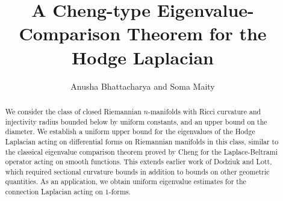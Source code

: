 \documentclass[10 pt, reqno]{amsart}
\begin{document}
\title{A Cheng-type Eigenvalue-Comparison Theorem for the Hodge Laplacian }
\author[A. Bhattacharya and S. Maity]{Anusha Bhattacharya and Soma Maity}

\address{Department of Mathematical Sciences, Indian Institute of Science Education and Research Mohali, \newline Sector 81, SAS Nagar, Punjab- 140306, India.}


\address{Department of Mathematical Sciences, Indian Institute of Science Education and Research Mohali, \newline Sector 81, SAS Nagar, Punjab- 140306, India.}


\begin{abstract}
We consider the class of closed Riemannian $n$-manifolds with Ricci curvature and injectivity radius bounded below by uniform constants, and an upper bound on the diameter. We establish a uniform upper bound for the eigenvalues of the Hodge Laplacian acting on differential forms on Riemannian manifolds in this class, similar to the classical eigenvalue comparison theorem proved by Cheng for the Laplace-Beltrami operator acting on smooth functions. This extends earlier work of  Dodziuk and Lott, which required sectional curvature bounds in addition to bounds on other geometric quantities. As an application, we obtain uniform eigenvalue estimates for the connection Laplacian acting on $1$-forms.

\end{abstract}




\maketitle
\end{document}
